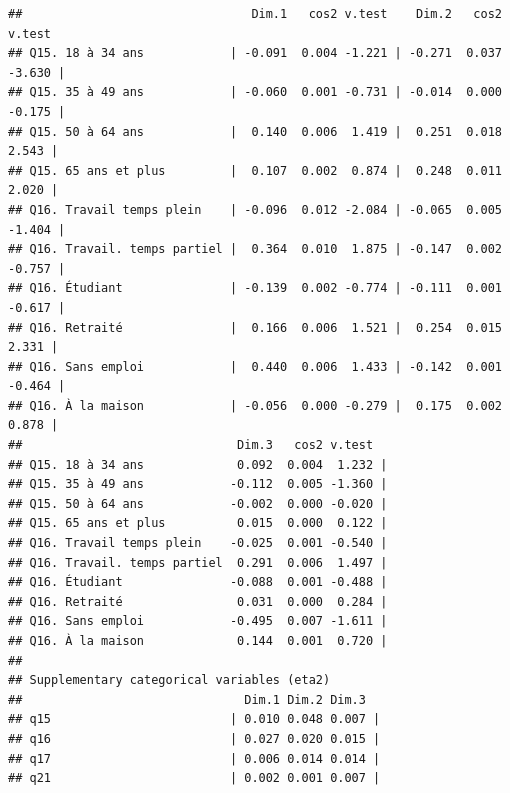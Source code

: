 \documentclass[
  11pt,
  french,
]{book}
\makeatletter
\newenvironment{Shaded}{\begin{snugshade}}{\end{snugshade}}
\newcommand{\CommentTok}[1]{\textcolor[rgb]{0.56,0.35,0.01}{\textit{#1}}}
\newcommand{\DataTypeTok}[1]{\textcolor[rgb]{0.13,0.29,0.53}{#1}}
\newcommand{\DecValTok}[1]{\textcolor[rgb]{0.00,0.00,0.81}{#1}}
\newcommand{\KeywordTok}[1]{\textcolor[rgb]{0.13,0.29,0.53}{\textbf{#1}}}
\newcommand{\NormalTok}[1]{#1}
\newcommand{\OperatorTok}[1]{\textcolor[rgb]{0.81,0.36,0.00}{\textbf{#1}}}
\newcommand{\StringTok}[1]{\textcolor[rgb]{0.31,0.60,0.02}{#1}}
\newenvironment{kframe}{%
\medskip{}
\setlength{\fboxsep}{.8em}
 \def\at@end@of@kframe{}%
 \ifinner\ifhmode%
  \def\at@end@of@kframe{\end{minipage}}%
  \begin{minipage}{\columnwidth}%
 \fi\fi%
 \def\FrameCommand##1{\hskip\@totalleftmargin \hskip-\fboxsep
 \colorbox{shadecolor}{##1}\hskip-\fboxsep
     \hskip-\linewidth \hskip-\@totalleftmargin \hskip\columnwidth}%
 \MakeFramed {\advance\hsize-\width
   \@totalleftmargin\z@ \linewidth\hsize
   \@setminipage}}%
 {\par\unskip\endMakeFramed%
 \at@end@of@kframe}
\renewenvironment{Shaded}{\begin{kframe}}{\end{kframe}}
\makeatother
\begin{document}
\begin{verbatim}
##                                Dim.1   cos2 v.test    Dim.2   cos2 v.test  
## Q15. 18 à 34 ans            | -0.091  0.004 -1.221 | -0.271  0.037 -3.630 |
## Q15. 35 à 49 ans            | -0.060  0.001 -0.731 | -0.014  0.000 -0.175 |
## Q15. 50 à 64 ans            |  0.140  0.006  1.419 |  0.251  0.018  2.543 |
## Q15. 65 ans et plus         |  0.107  0.002  0.874 |  0.248  0.011  2.020 |
## Q16. Travail temps plein    | -0.096  0.012 -2.084 | -0.065  0.005 -1.404 |
## Q16. Travail. temps partiel |  0.364  0.010  1.875 | -0.147  0.002 -0.757 |
## Q16. Étudiant               | -0.139  0.002 -0.774 | -0.111  0.001 -0.617 |
## Q16. Retraité               |  0.166  0.006  1.521 |  0.254  0.015  2.331 |
## Q16. Sans emploi            |  0.440  0.006  1.433 | -0.142  0.001 -0.464 |
## Q16. À la maison            | -0.056  0.000 -0.279 |  0.175  0.002  0.878 |
##                              Dim.3   cos2 v.test  
## Q15. 18 à 34 ans             0.092  0.004  1.232 |
## Q15. 35 à 49 ans            -0.112  0.005 -1.360 |
## Q15. 50 à 64 ans            -0.002  0.000 -0.020 |
## Q15. 65 ans et plus          0.015  0.000  0.122 |
## Q16. Travail temps plein    -0.025  0.001 -0.540 |
## Q16. Travail. temps partiel  0.291  0.006  1.497 |
## Q16. Étudiant               -0.088  0.001 -0.488 |
## Q16. Retraité                0.031  0.000  0.284 |
## Q16. Sans emploi            -0.495  0.007 -1.611 |
## Q16. À la maison             0.144  0.001  0.720 |
## 
## Supplementary categorical variables (eta2)
##                               Dim.1 Dim.2 Dim.3  
## q15                         | 0.010 0.048 0.007 |
## q16                         | 0.027 0.020 0.015 |
## q17                         | 0.006 0.014 0.014 |
## q21                         | 0.002 0.001 0.007 |
\end{verbatim}

\begin{Shaded}
\end{Shaded}
\end{document}
